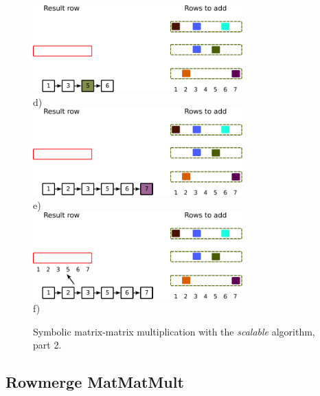 \begin{figure}[H]
\centering
\includegraphics[width=0.72\textwidth]{scalable/spgemm-scalable-6}\\
d)\\
\vspace*{15mm}
\includegraphics[width=0.72\textwidth]{scalable/spgemm-scalable-8}\\
e)\\
\vspace*{15mm}
\includegraphics[width=0.72\textwidth]{scalable/spgemm-scalable-10}\\
f)\\
\vspace*{10mm}
\caption{Symbolic matrix-matrix multiplication with the \textit{scalable} algorithm, part 2.}
\label{fig:spgemm-scalable_2}
\end{figure}



\subsection{Rowmerge MatMatMult}

